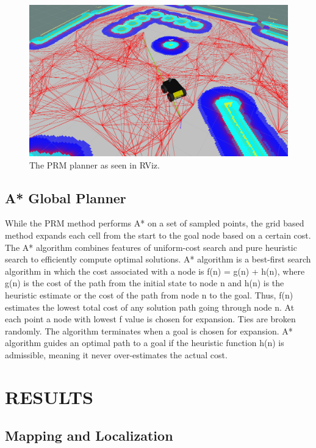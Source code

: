 \documentclass[letterpaper, 10 pt, conference]{ieeeconf}  %
\begin{document}
	\begin{figure}[!ht]
		\centering
		\includegraphics[width=1.0\columnwidth]{Figures/PRM_CloseUP}
		\caption{The PRM planner as seen in RViz.}
		\label{PRM_planner}
	\end{figure}

\subsection{A* Global Planner}

While the PRM method performs A* on a set of sampled points, the grid based method expands each cell from the start to the goal node based on a certain cost. The A* algorithm combines features of uniform-cost search and pure heuristic search to efficiently compute optimal solutions. A* algorithm is a best-first search algorithm in which the cost associated with a node is f(n) = g(n) + h(n), where g(n) is the cost of the path from the initial state to node n and h(n) is the heuristic estimate or the cost of the path from node n to the goal. Thus, f(n) estimates the lowest total cost of any solution path going through node n. At each point a node with lowest f value is chosen for expansion. Ties are broken randomly. The algorithm terminates when a goal is chosen for expansion. A* algorithm guides an optimal path to a goal if the heuristic function h(n) is admissible, meaning it never over-estimates the actual cost. 

\section{RESULTS}

\subsection{Mapping and Localization}
\end{document}
